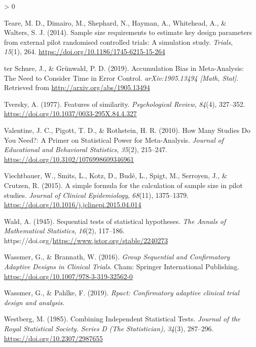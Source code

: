 \documentclass[
  english,
  ,jou, a4paper,floatsintext]{apa6}
\newlength{\cslhangindent}
\newenvironment{CSLReferences}[2] %
 {%
  \setlength{\parindent}{0pt}
  \ifodd #1 \everypar{\setlength{\hangindent}{\cslhangindent}}\ignorespaces\fi
  \ifnum #2 > 0
  \setlength{\parskip}{#2\baselineskip}
  \fi
 }%
 {}
\begin{document}
\begin{CSLReferences}{1}{0}
\leavevmode\hypertarget{ref-teare_sample_2014}{}%
Teare, M. D., Dimairo, M., Shephard, N., Hayman, A., Whitehead, A., \& Walters, S. J. (2014). Sample size requirements to estimate key design parameters from external pilot randomised controlled trials: A simulation study. \emph{Trials}, \emph{15}(1), 264. \url{https://doi.org/10.1186/1745-6215-15-264}

\leavevmode\hypertarget{ref-ter_schure_accumulation_2019}{}%
ter Schure, J., \& Grünwald, P. D. (2019). Accumulation {Bias} in {Meta}-{Analysis}: The {Need} to {Consider Time} in {Error Control}. \emph{arXiv:1905.13494 {[}Math, Stat{]}}. Retrieved from \url{http://arxiv.org/abs/1905.13494}

\leavevmode\hypertarget{ref-tversky_features_1977}{}%
Tversky, A. (1977). Features of similarity. \emph{Psychological Review}, \emph{84}(4), 327--352. \url{https://doi.org/10.1037/0033-295X.84.4.327}

\leavevmode\hypertarget{ref-valentine_how_2010}{}%
Valentine, J. C., Pigott, T. D., \& Rothstein, H. R. (2010). How {Many Studies Do You Need}?: A {Primer} on {Statistical Power} for {Meta}-{Analysis}. \emph{Journal of Educational and Behavioral Statistics}, \emph{35}(2), 215--247. \url{https://doi.org/10.3102/1076998609346961}

\leavevmode\hypertarget{ref-viechtbauer_simple_2015}{}%
Viechtbauer, W., Smits, L., Kotz, D., Budé, L., Spigt, M., Serroyen, J., \& Crutzen, R. (2015). A simple formula for the calculation of sample size in pilot studies. \emph{Journal of Clinical Epidemiology}, \emph{68}(11), 1375--1379. \url{https://doi.org/10.1016/j.jclinepi.2015.04.014}

\leavevmode\hypertarget{ref-wald_sequential_1945}{}%
Wald, A. (1945). Sequential tests of statistical hypotheses. \emph{The Annals of Mathematical Statistics}, \emph{16}(2), 117--186. https://doi.org/\url{https://www.jstor.org/stable/2240273}

\leavevmode\hypertarget{ref-wassmer_group_2016}{}%
Wassmer, G., \& Brannath, W. (2016). \emph{Group {Sequential} and {Confirmatory Adaptive Designs} in {Clinical Trials}}. {Cham}: {Springer International Publishing}. \url{https://doi.org/10.1007/978-3-319-32562-0}

\leavevmode\hypertarget{ref-wassmer_rpact_2019}{}%
Wassmer, G., \& Pahlke, F. (2019). \emph{Rpact: Confirmatory adaptive clinical trial design and analysis}.

\leavevmode\hypertarget{ref-westberg_combining_1985}{}%
Westberg, M. (1985). Combining {Independent Statistical Tests}. \emph{Journal of the Royal Statistical Society. Series D (The Statistician)}, \emph{34}(3), 287--296. \url{https://doi.org/10.2307/2987655}


\end{CSLReferences}
\end{document}

